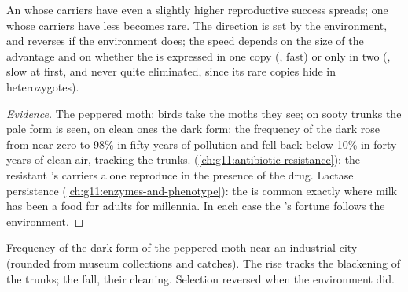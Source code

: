\begin{proposition}\label{prop:g12:selection-drift-speciation:direction}
An  whose carriers have even a slightly higher reproductive
success spreads; one whose carriers have less becomes rare. The
direction is set by the environment, and reverses if the environment
does; the speed depends on the size of the advantage and on whether
the  is expressed in one copy (, fast) or only in two
(, slow at first, and never quite eliminated, since its rare
copies hide in heterozygotes).
\end{proposition}
\begin{proof}[Evidence]
The peppered moth: birds take the moths they see; on sooty trunks the
pale form is seen, on clean ones the dark form; the frequency of the
dark  rose from near zero to 98\% in fifty years of pollution and
fell back below 10\% in forty years of clean air, tracking the trunks.
 (\cref{ch:g11:antibiotic-resistance}): the
resistant 's carriers alone reproduce in the presence of the
drug. Lactase persistence (\cref{ch:g11:enzymes-and-phenotype}): the
 is common exactly where milk has been a food for adults for
millennia. In each case the 's fortune follows the environment.
\end{proof}

\begin{omfigure}

{\small Frequency of the dark form of the peppered moth near an
industrial city (rounded from museum collections and catches). The
rise tracks the blackening of the trunks; the fall, their cleaning.
Selection reversed when the environment did.}
\end{omfigure}

